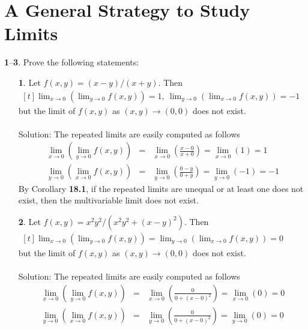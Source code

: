 \documentclass[12pt]{amsbook}
\begin{document}
\section{A General Strategy to Study Limits}
\noindent
{\small {\bf 1}--{\bf 3}}. Prove the following statements:
\begin{enumerate}
\item[{\small\bf 1}.] Let $f(x,y)=(x-y)/(x+y)$. Then
\\
 $\! \begin{aligned}[t]
\lim_{x \rightarrow 0}(\lim_{y \rightarrow 0}f(x,y))=1, \ \lim_{y \rightarrow 0}(\lim_{x \rightarrow 0}f(x,y))=-1
\end{aligned}$ 
\\
but the limit of $f(x,y)$ as $(x,y) \rightarrow (0,0)$ does not exist.
\\
\\
{\sc Solution}: The repeated limits are easily computed as follows
\begin{eqnarray*}
\lim_{x \rightarrow 0}(\lim_{y \rightarrow 0}f(x,y))&=&\lim_{x \rightarrow 0}(\frac{x-0}{x+0})=\lim_{x \rightarrow 0}(1)=1 \\
\lim_{y \rightarrow 0}(\lim_{x \rightarrow 0}f(x,y))&=&\lim_{y \rightarrow 0}(\frac{0-y}{0+y})=\lim_{y \rightarrow 0}(-1)=-1 
\end{eqnarray*}
By Corollary {\bf 18.1}, if the repeated limits are unequal or at least one does not exist, then the multivariable limit does not exist.
\\
\item[{\small\bf 2}.] Let $f(x,y)=x^2y^2/(x^2y^2+(x-y)^2)$. Then
\\
 $\! \begin{aligned}[t]
\lim_{x \rightarrow 0}(\lim_{y \rightarrow 0}f(x,y))=\lim_{y \rightarrow 0}(\lim_{x \rightarrow 0}f(x,y))=0
\end{aligned}$ 
\\
but the limit of $f(x,y)$ as $(x,y) \rightarrow (0,0)$ does not exist.
\\
\\
{\sc Solution}: The repeated limits are easily computed as follows
\begin{eqnarray*}
\lim_{x \rightarrow 0}(\lim_{y \rightarrow 0}f(x,y))&=&\lim_{x \rightarrow 0}(\frac{0}{0+(x-0)^2})=\lim_{x \rightarrow 0}(0)=0 \\
\lim_{y \rightarrow 0}(\lim_{x \rightarrow 0}f(x,y))&=&\lim_{y \rightarrow 0}(\frac{0}{0+(x-0)^2})=\lim_{y \rightarrow 0}(0)=0
\end{eqnarray*}

\end{enumerate}
\end{document}

